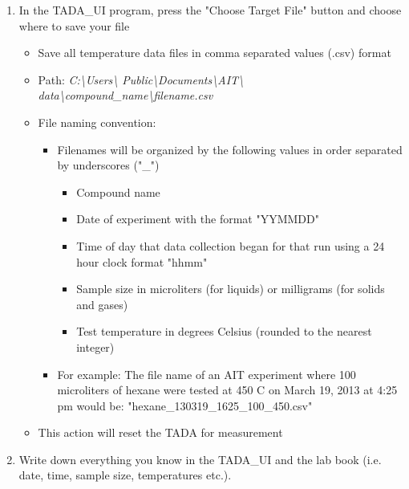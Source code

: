 \documentclass[letterpaper,11pt]{article}
\begin{document}
\begin{enumerate}
    \item In the TADA\_UI program, press the "Choose Target File" button and 
        choose where to save your file
        \begin{itemize}
        \item Save all temperature data files in comma separated values (.csv) 
            format
        \item Path: \textit{C:\textbackslash Users\textbackslash 
            Public\textbackslash Documents\textbackslash AIT\textbackslash 
            data\textbackslash compound\_name\textbackslash filename.csv}
        \item File naming convention: 
            \begin{itemize}
            \item Filenames will be organized by the following values in order 
                separated by underscores ("\_")
                    \begin{itemize}
                    \item Compound name
                    \item Date of experiment with the format "YYMMDD"
                    \item Time of day that data collection began for that run
                        using a 24 hour clock format "hhmm"
                    \item Sample size in microliters (for liquids) or milligrams
                        (for solids and gases)
                    \item Test temperature in degrees Celsius (rounded to the 
                        nearest integer)
                    \end{itemize}
                    
            \item For example: The file name of an AIT experiment where 100 
                microliters of hexane were tested at 450 \degree C on 
                March 19, 2013 at 4:25 pm would be: \newline
                "hexane\_130319\_1625\_100\_450.csv"
            \end{itemize}    
        \item This action will reset the TADA for measurement
        \end{itemize}
    
    \item Write down everything you know in the TADA\_UI and the lab book 
        (i.e. date, time, sample size, temperatures etc.).
    

\end{enumerate}
\end{document}
